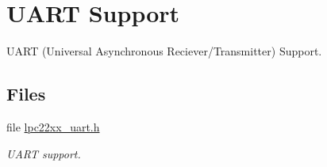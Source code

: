 \hypertarget{group__rtl22xx__uart}{}\section{U\+A\+RT Support}
\label{group__rtl22xx__uart}


U\+A\+RT (Universal Asynchronous Reciever/\+Transmitter) Support.  


\subsection*{Files}
\begin{DoxyCompactItemize}
\item 
file \mbox{\hyperlink{lpc22xx__uart_8h}{lpc22xx\+\_\+uart.\+h}}
\begin{DoxyCompactList}\small\item\em U\+A\+RT support. \end{DoxyCompactList}\end{DoxyCompactItemize}
